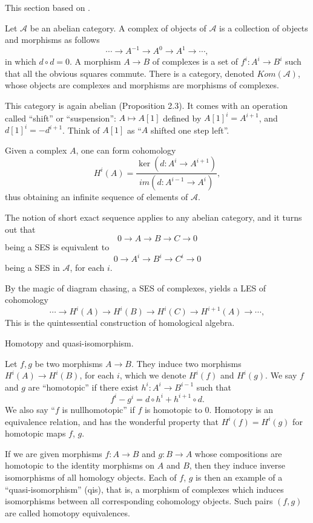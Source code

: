 \documentclass[12pt]{article}
\theoremstyle{plain}
\theoremstyle{definition}
\numberwithin{equation}{section}
\newcommand{\im}{im}
\newcommand{\CA}{\mathcal{A}}
\begin{document}
This section based on {\cite[Chapter 2]{Huybrechts}}.

Let $\CA$ be an abelian category. A complex of objects of $\CA$ is a collection of objects and morphisms as follows
\[
\cdots \rightarrow A^{-1} \rightarrow A^0 \rightarrow A^1 \rightarrow \cdots,
\]
in which $d \circ d = 0$. A morphism $A \rightarrow B$ of complexes is a set of $f^i : A^i \rightarrow B^i$ such that all the obvious squares commute. There is a category, denoted $Kom(\CA)$, whose objects are complexes and morphisms are morphisms of complexes.

This category is again abelian (Proposition 2.3). It comes with an operation called ``shift'' or ``suspension'': $A \mapsto A[1]$ defined by $A[1]^i = A^{i+1}$, and $d[1]^i = -d^{i+1}$. Think of $A[1]$ as ``$A$ shifted one step left''.



Given a complex $A$, one can form cohomology
\[
H^i(A) = \frac{\ker(d : A^i \rightarrow A^{i+1})}{\im(d : A^{i-1} \rightarrow A^i)},
\]
thus obtaining an infinite sequence of elements of $\CA$.


The notion of short exact sequence applies to any abelian category, and it turns out that
\[
0 \rightarrow A \rightarrow B \rightarrow C \rightarrow 0
\]
being a SES is equivalent to
\[
0 \rightarrow A^i \rightarrow B^i \rightarrow C^i \rightarrow 0
\]
being a SES in $\CA$, for each $i$.

By the magic of diagram chasing, a SES of complexes, yields a LES of cohomology
\[
\cdots \rightarrow H^i(A) \rightarrow H^i(B) \rightarrow H^i(C) \rightarrow H^{i+1}(A) \rightarrow \cdots,
\]
This is the quintessential construction of homological algebra.

Homotopy and quasi-isomorphism.

Let $f, g$ be two morphisms $A \rightarrow B$. They induce two morphisms $H^i(A) \rightarrow H^i(B)$, for each $i$, which we denote $H^i(f)$ and $H^i(g)$. We say $f$ and $g$ are ``homotopic'' if there exist $h^i : A^i \rightarrow B^{i-1}$ such that
\[
f^i - g^i = d \circ h^i + h^{i+1} \circ d.
\]
We also say ``$f$ is nullhomotopic'' if $f$ is homotopic to $0$. Homotopy is an equivalence relation, and has the wonderful property that $H^i(f) = H^i(g)$ for homotopic maps $f$, $g$.

If we are given morphisms $f : A \rightarrow B$ and $g : B \rightarrow A$ whose compositions are homotopic to the identity morphisms on $A$ and $B$, then they induce inverse isomorphisms of all homology objects. Each of $f$, $g$ is then an example of a ``quasi-isomorphism'' (qis), that is, a morphism of complexes which induces isomorphisms between all corresponding cohomology objects. Such pairs $(f, g)$ are called homotopy equivalences.
\end{document}
